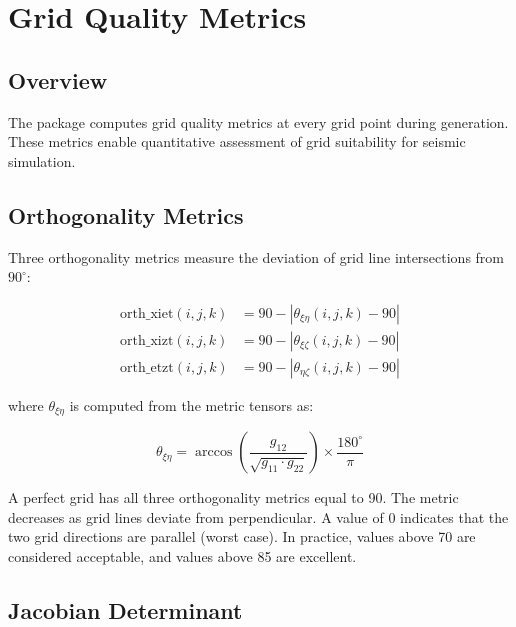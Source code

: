 \documentclass[11pt,a4paper]{report}
\begin{document}
\chapter{Grid Quality Metrics}

\section{Overview}

The package computes grid quality metrics at every grid point during generation. These metrics enable quantitative assessment of grid suitability for seismic simulation.

\section{Orthogonality Metrics}

Three orthogonality metrics measure the deviation of grid line intersections from $90^\circ$:

\begin{align}
    \text{orth\_xiet}(i,j,k) &= 90 - \left| \theta_{\xi\eta}(i,j,k) - 90 \right| \\
    \text{orth\_xizt}(i,j,k) &= 90 - \left| \theta_{\xi\zeta}(i,j,k) - 90 \right| \\
    \text{orth\_etzt}(i,j,k) &= 90 - \left| \theta_{\eta\zeta}(i,j,k) - 90 \right|
\end{align}

where $\theta_{\xi\eta}$ is computed from the metric tensors as:

\begin{equation}
    \theta_{\xi\eta} = \arccos\left( \frac{g_{12}}{\sqrt{g_{11} \cdot g_{22}}} \right) \times \frac{180^\circ}{\pi}
\end{equation}

A perfect grid has all three orthogonality metrics equal to 90. The metric decreases as grid lines deviate from perpendicular. A value of 0 indicates that the two grid directions are parallel (worst case). In practice, values above 70 are considered acceptable, and values above 85 are excellent.

\section{Jacobian Determinant}
\end{document}
